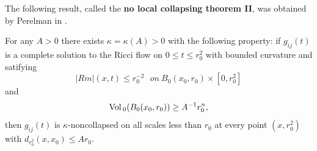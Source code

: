 The following result, called the {\bf no local collapsing theorem
II}, was obtained by
Perelman in \cite{P1}.


\begin{theorem}
  \label{thm:cz-no-local-collapsing-for-complete-flows}
For any $A >0$ there exists $\kappa=\kappa(A)>0$ with the
following property: if $g_{ij}(t)$ is a complete solution to the
Ricci flow on $0\leq t\leq r_0^2$ with bounded curvature and
satifying
$$
|Rm|(x,t)\leq r_0^{-2}\ \ \ on \ B_0(x_0,r_0)\times [0,r_0^2]
$$
and
$$
{\rm Vol}\,_0(B_0(x_0,r_0))\geq A^{-1}r_0^n,
$$
then $g_{ij}(t)$ is $\kappa$-noncollapsed on all scales less than
$r_0$ at every point $(x,r_0^2)$ with $d_{r_0^2}(x,x_0)\leq Ar_0$.
\end{theorem}

